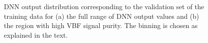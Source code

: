 
\captionsetup[subfloat]{captionskip=7pt} %
\begin{figure}[t]
    \caption{DNN output distribution corresponding to the validation set of the training data for (a) the full range of DNN output values and (b) the region with high VBF signal purity. The binning is chosen as explained in the text.}
    \label{fig:dnn-val-set}
\end{figure}


